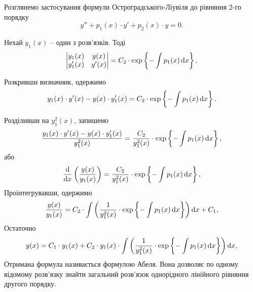 Розглянемо застосування формули Остроградського-Ліувіля до рівняння 2-го порядку
\begin{equation}
	\label{eq:3.1.36}
	y'' + p_1(x) \cdot y' + p_2(x) \cdot y = 0.
\end{equation}

Нехай $y_1(x)$ -- один з розв’язків. Тоді
\begin{equation}
	\label{eq:3.1.37}
	\begin{vmatrix}
		y_1(x) & y(x) \\
		y_1'(x) & y'(x)
	\end{vmatrix} = C_2 \cdot \exp \left\{ - \int p_1(x) \mathop{}\!\mathrm{d} x \right\}.
\end{equation}

Розкривши визначник, одержимо
\begin{equation}
	\label{eq:3.1.38}
	y_1(x) \cdot y'(x) - y(x) \cdot y_1'(x) = C_2 \cdot \exp \left\{ - \int p_1(x) \mathop{}\!\mathrm{d} x \right\}.
\end{equation}
 
Розділивши на $y_1^2(x)$, запишемо
\begin{equation}
	\label{eq:3.1.39}
	\frac{y_1(x) \cdot y'(x) - y(x) \cdot y_1'(x)}{y_1^2(x)} = \frac{C_2}{y_1^2(x)} \cdot \exp \left\{ - \int p_1(x) \mathop{}\!\mathrm{d} x \right\},
\end{equation}
або
\begin{equation}
	\label{eq:3.1.40}
	\frac{\mathop{}\!\mathrm{d}}{\mathop{}\!\mathrm{d} x} \left( \frac{y(x)}{y_1(x)} \right) = \frac{C_2}{y_1^2(x)} \cdot \exp \left\{ - \int p_1(x) \mathop{}\!\mathrm{d} x \right\},
\end{equation}
Проінтегрувавши, одержимо
\begin{equation}
	\label{eq:3.1.41}
	\frac{y(x)}{y_1(x)} = C_2 \cdot \int \left( \frac{1}{y_1^2(x)} \cdot \exp \left\{ - \int p_1(x) \mathop{}\!\mathrm{d} x \right\} \right) \mathop{}\!\mathrm{d} x + C_1,
\end{equation}
Остаточно
\begin{equation}
	\label{eq:3.1.42}
	y(x) = C_1 \cdot y_1(x) + C_2 \cdot y_1(x) \cdot \int \left( \frac{1}{y_1^2(x)} \cdot \exp \left\{ - \int p_1(x) \mathop{}\!\mathrm{d} x \right\} \right) \mathop{}\!\mathrm{d} x,
\end{equation}
Отримана формула називається формулою Абеля. Вона дозволяє по одному відомому розв’язку знайти загальний розв’язок однорідного лінійного рівняння другого порядку.
